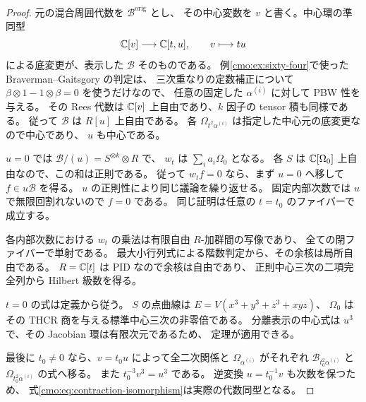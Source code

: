 \begin{proof}
元の混合周囲代数を $\mathcal B^{\mathrm{orig}}$ とし、
その中心変数を $v$ と書く。中心環の準同型
\[
 \mathbb C[v]\longrightarrow\mathbb C[t,u],\qquad v\longmapsto tu
\]
による底変更が、表示した $\mathscr B$ そのものである。
例\ref{cmo:ex:sixty-four}で使った Braverman--Gaitsgory の判定は、
三次重なりの定数補正について $\beta\otimes1-1\otimes\beta=0$ を使うだけなので、
任意の固定した $\alpha^{(i)}$ に対して PBW 性を与える。
その Rees 代数は $\mathbb C[v]$ 上自由であり、$k$ 因子の tensor 積も同様である。
従って $\mathscr B$ は $R[u]$ 上自由である。
各 $\Omega_{t^2\alpha^{(i)}}$ は指定した中心元の底変更なので中心であり、
$u$ も中心である。

$u=0$ では $\mathscr B/(u)=S^{\otimes k}\otimes R$ で、
$w_t$ は $\sum_i a_i\Omega_0$ となる。
各 $S$ は $\mathbb C[\Omega_0]$ 上自由なので、この和は正則である。
従って $w_t f=0$ なら、まず $u=0$ へ移して $f\in u\mathscr B$ を得る。
$u$ の正則性により同じ議論を繰り返せる。
固定内部次数では $u$ で無限回割れないので $f=0$ である。
同じ証明は任意の $t=t_0$ のファイバーで成立する。

各内部次数における $w_t$ の乗法は有限自由 $R$-加群間の写像であり、
全ての閉ファイバーで単射である。
最大小行列式による階数判定から、その余核は局所自由である。
$R=\mathbb C[t]$ は PID なので余核は自由であり、
正則中心三次の二項完全列から Hilbert 級数を得る。

$t=0$ の式は定義から従う。
$S$ の点曲線は $E=V(x^3+y^3+z^3+xyz)$、
$\Omega_0$ はその THCR 商を与える標準中心三次の非零倍である。
分離表示の中心式は $u^3$ で、その Jacobian 環は有限次元であるため、
定理が適用できる。

最後に $t_0\ne0$ なら、$v=t_0u$ によって全二次関係と
$\Omega_{\alpha^{(i)}}$ がそれぞれ
$\mathcal B_{t_0^2\alpha^{(i)}}$ と $\Omega_{t_0^2\alpha^{(i)}}$ の式へ移る。
また $t_0^{-3}v^3=u^3$ である。
逆変換 $u=t_0^{-1}v$ も次数を保つため、
式\eqref{cmo:eq:contraction-isomorphism}は実際の代数同型となる。
\end{proof}

